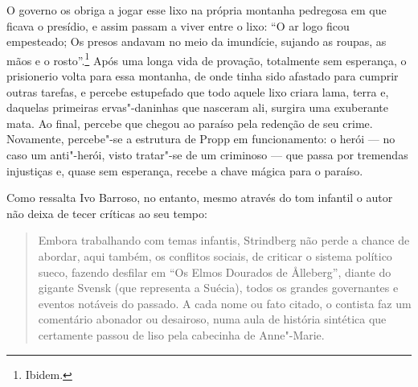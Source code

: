 O governo os obriga a jogar esse lixo na própria montanha pedregosa em que ficava o presídio, e assim passam a viver entre o lixo: ``O ar logo
ficou empesteado; Os presos andavam no meio da imundície, sujando as
roupas, as mãos e o rosto''.\footnote{Ibidem.} Após uma longa vida de provação, totalmente sem esperança, o prisionerio volta para essa montanha, de onde tinha sido afastado para cumprir outras tarefas, e percebe estupefado que todo aquele lixo criara lama, terra e, daquelas primeiras ervas"-daninhas que nasceram ali,  surgira uma exuberante mata. Ao final, percebe que chegou ao paraíso pela redenção de seu crime. Novamente, percebe"-se a estrutura de Propp em funcionamento: o herói --- no caso um anti"-herói, visto tratar"-se de um criminoso --- que passa por tremendas injustiças e, quase sem esperança, recebe a chave mágica para o paraíso.

Como ressalta Ivo Barroso, no entanto, mesmo através do tom infantil o autor não deixa de tecer críticas ao seu tempo:

\begin{quote}
Embora trabalhando com temas infantis, Strindberg não perde a chance de 
abordar, aqui também, os conflitos sociais, de criticar o sistema
político sueco, fazendo desfilar em ``Os Elmos Dourados de
\r Alleberg'', diante do gigante Svensk (que representa a Suécia), todos os
grandes governantes e eventos notáveis do passado. A cada nome ou fato
citado, o contista faz um comentário abonador ou desairoso, numa aula
de história sintética que certamente passou de liso pela cabecinha de
Anne"-Marie.
\end{quote}